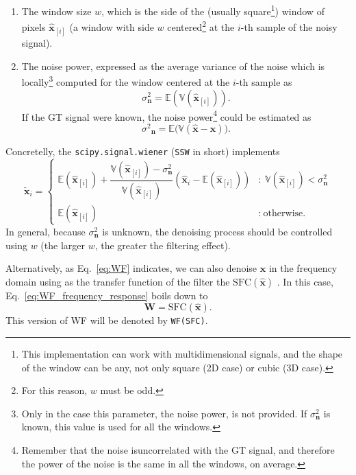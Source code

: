 \documentclass{article}
\begin{document}
\begin{enumerate}
\item The window size $w$, which is the side of the (usually
  square\footnote{This implementation can work with multidimensional
    signals, and the shape of the window can be any, not only square
    (2D case) or cubic (3D case).}) window of pixels
  $\hat{\mathbf{x}}_{[i]}$ (a window with side $w$
  centered\footnote{For this reason, $w$ must be odd.} at the $i$-th
  sample of the noisy signal).
\item The noise power, expressed as the average variance of the noise
  which is locally\footnote{Only in the case this parameter, the noise
    power, is not provided. If ${\sigma^2_{\mathbf{n}}}$ is known,
    this value is used for all the windows.} computed for the window
  centered at the $i$-th sample as
  \begin{equation}
    {\sigma^2_{\mathbf{n}}}=\mathbb{E}\left(\mathbb{V}(\hat{\mathbf{x}}_{[i]})\right).
  \end{equation}
  If the GT signal were known, the noise power\footnote{Remember that
    the noise isuncorrelated with the GT signal, and therefore the
    power of the noise is the same in all the windows, on average.}
  could be estimated as
  \begin{equation}
    {\sigma^2}_{\mathbf{n}} = \mathbb{E}\big(\mathbb{V}(\hat{\mathbf{x}}-\mathbf{x})\big).
  \end{equation}
\end{enumerate}
Concretelly, the \texttt{scipy.signal.wiener} (\texttt{SSW} in short) implements
\begin{equation}
  \tilde{\mathbf{x}}_i = \left\{
    \begin{array}{ll}
      \mathbb{E}(\hat{\mathbf{x}}_{[i]}) + \dfrac{\mathbb{V}(\hat{\mathbf{x}}_{[i]})-\sigma^2_\mathbf{n}}{\mathbb{V}(\hat{\mathbf{x}}_{[i]})}\left(\hat{\mathbf{x}}_i-\mathbb{E}(\hat{\mathbf{x}}_{[i]})\right) & : \ \mathbb{V}(\hat{\mathbf{x}}_{[i]}) < \sigma^2_\mathbf{n} \\
      \mathbb{E}(\hat{\mathbf{x}}_{[i]}) & : \ \text{otherwise.}
    \end{array} \right.
\end{equation}
In general, because $\sigma^2_{\mathbf{n}}$ is unknown, the denoising
process should be controlled using $w$ (the larger $w$, the greater
the filtering effect).

Alternatively, as Eq.~\ref{eq:WF} indicates, we can also denoise
$\hat{\mathbf{x}}$ in the frequency domain using as the transfer
function of the filter the $\text{SFC}(\hat{\mathbf{x}})$
\cite{verbeke2024self}. In this case,
Eq.~\ref{eq:WF_frequency_response} boils down to
\begin{equation}
  \mathbf{W} = \text{SFC}(\hat{\mathbf{x}}).
  \label{eq:WF_SFC}
\end{equation}
This version of WF will be denoted by \texttt{WF(SFC)}.
\end{document}
